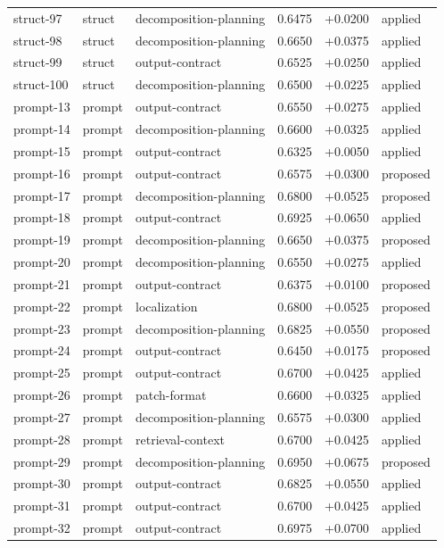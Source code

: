 \begin{center}
\begin{longtable}{llp{5.2cm}rrl}
struct-97 & struct & decomposition-planning & 0.6475 & +0.0200 & applied \\
struct-98 & struct & decomposition-planning & 0.6650 & +0.0375 & applied \\
struct-99 & struct & output-contract & 0.6525 & +0.0250 & applied \\
struct-100 & struct & decomposition-planning & 0.6500 & +0.0225 & applied \\
prompt-13 & prompt & output-contract & 0.6550 & +0.0275 & applied \\
prompt-14 & prompt & decomposition-planning & 0.6600 & +0.0325 & applied \\
prompt-15 & prompt & output-contract & 0.6325 & +0.0050 & applied \\
prompt-16 & prompt & output-contract & 0.6575 & +0.0300 & proposed \\
prompt-17 & prompt & decomposition-planning & 0.6800 & +0.0525 & proposed \\
prompt-18 & prompt & output-contract & 0.6925 & +0.0650 & applied \\
prompt-19 & prompt & decomposition-planning & 0.6650 & +0.0375 & proposed \\
prompt-20 & prompt & decomposition-planning & 0.6550 & +0.0275 & applied \\
prompt-21 & prompt & output-contract & 0.6375 & +0.0100 & proposed \\
prompt-22 & prompt & localization & 0.6800 & +0.0525 & proposed \\
prompt-23 & prompt & decomposition-planning & 0.6825 & +0.0550 & proposed \\
prompt-24 & prompt & output-contract & 0.6450 & +0.0175 & proposed \\
prompt-25 & prompt & output-contract & 0.6700 & +0.0425 & applied \\
prompt-26 & prompt & patch-format & 0.6600 & +0.0325 & applied \\
prompt-27 & prompt & decomposition-planning & 0.6575 & +0.0300 & applied \\
prompt-28 & prompt & retrieval-context & 0.6700 & +0.0425 & applied \\
prompt-29 & prompt & decomposition-planning & 0.6950 & +0.0675 & proposed \\
prompt-30 & prompt & output-contract & 0.6825 & +0.0550 & applied \\
prompt-31 & prompt & output-contract & 0.6700 & +0.0425 & applied \\
prompt-32 & prompt & output-contract & 0.6975 & +0.0700 & applied \\

\end{longtable}
\end{center}
